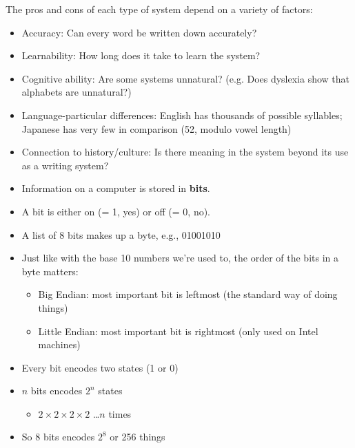 \documentclass[a4paper,landscape,headrule,footrule,xetex]{foils}
\begin{document}



The pros and cons of each type of system depend on a variety of factors: 
\begin{itemize}
\item Accuracy:  Can every word be written down accurately?
\item Learnability: How long does it take to learn the system?
\item Cognitive ability: Are some systems unnatural? (e.g. Does dyslexia show that alphabets are unnatural?)
\item Language-particular differences: English has thousands of
  possible syllables; Japanese has very few in comparison (52, modulo
  vowel length)
\item Connection to history/culture: Is there meaning in the system beyond its use as a writing system?
\end{itemize}








\begin{itemize}
\item Information on a computer is stored in \textbf{bits}.
\item A bit is either on (= 1, yes) or off (= 0, no).
\item A list of 8 bits makes up a byte, e.g., 01001010
\item Just like with the base 10 numbers we're used to, the order of the bits in a byte matters:
  \begin{itemize}
  \item Big Endian: most important bit is leftmost (the standard way of doing things)
  \item Little Endian: most important bit is rightmost (only used on Intel machines)
  \end{itemize}
\end{itemize}


\begin{itemize}
\item Every bit encodes two states (1 or 0)
\item $n$ bits encodes $2^n$ states
  \begin{itemize}
  \item $2 \times 2 \times 2 \times 2$ \ldots $n$ times
  \end{itemize}
\item So 8 bits encodes $2^8$ or 256 things
\end{itemize}
\end{document}
